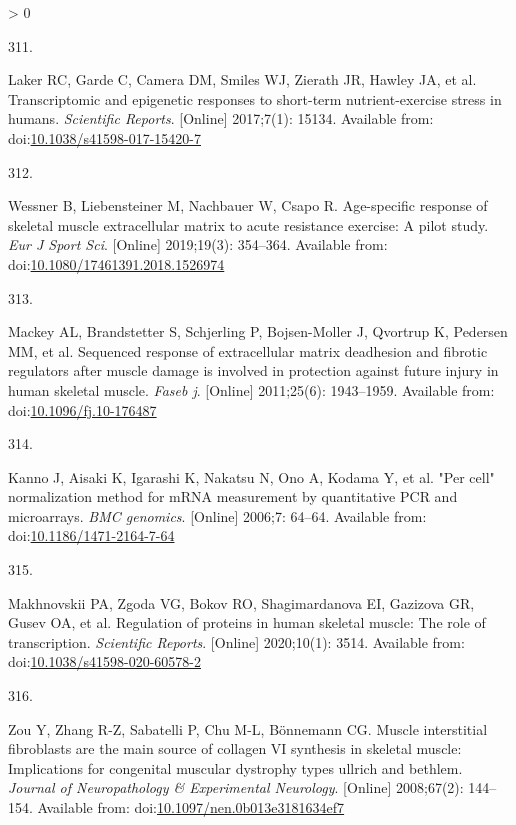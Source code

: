 \documentclass[twoside,10pt]{gihclass} %
\newlength{\cslhangindent}
\newlength{\csllabelwidth}
\newenvironment{CSLReferences}[3] %
 {%
  \setlength{\parindent}{0pt}
  \ifodd #1 \everypar{\setlength{\hangindent}{\cslhangindent}}\ignorespaces\fi
  \ifnum #2 > 0
  \setlength{\parskip}{#2\baselineskip}
  \fi
 }%
 {}
\newcommand{\CSLLeftMargin}[1]{\parbox[t]{\maxof{\widthof{#1}}{\csllabelwidth}}{#1}}
\newcommand{\CSLRightInline}[1]{\parbox[t]{\linewidth}{#1}}
\begin{document}
\begin{CSLReferences}{0}{0}
\leavevmode\hypertarget{ref-RN2401}{}%
\CSLLeftMargin{311. }
\CSLRightInline{Laker RC, Garde C, Camera DM, Smiles WJ, Zierath JR, Hawley JA, et al. Transcriptomic and epigenetic responses to short-term nutrient-exercise stress in humans. \emph{Scientific Reports}. {[}Online{]} 2017;7(1): 15134. Available from: doi:\href{https://doi.org/10.1038/s41598-017-15420-7}{10.1038/s41598-017-15420-7}}

\leavevmode\hypertarget{ref-RN2451}{}%
\CSLLeftMargin{312. }
\CSLRightInline{Wessner B, Liebensteiner M, Nachbauer W, Csapo R. Age-specific response of skeletal muscle extracellular matrix to acute resistance exercise: A pilot study. \emph{Eur J Sport Sci}. {[}Online{]} 2019;19(3): 354--364. Available from: doi:\href{https://doi.org/10.1080/17461391.2018.1526974}{10.1080/17461391.2018.1526974}}

\leavevmode\hypertarget{ref-RN2453}{}%
\CSLLeftMargin{313. }
\CSLRightInline{Mackey AL, Brandstetter S, Schjerling P, Bojsen-Moller J, Qvortrup K, Pedersen MM, et al. Sequenced response of extracellular matrix deadhesion and fibrotic regulators after muscle damage is involved in protection against future injury in human skeletal muscle. \emph{Faseb j}. {[}Online{]} 2011;25(6): 1943--1959. Available from: doi:\href{https://doi.org/10.1096/fj.10-176487}{10.1096/fj.10-176487}}

\leavevmode\hypertarget{ref-RN2182}{}%
\CSLLeftMargin{314. }
\CSLRightInline{Kanno J, Aisaki K, Igarashi K, Nakatsu N, Ono A, Kodama Y, et al. "Per cell" normalization method for mRNA measurement by quantitative PCR and microarrays. \emph{BMC genomics}. {[}Online{]} 2006;7: 64--64. Available from: doi:\href{https://doi.org/10.1186/1471-2164-7-64}{10.1186/1471-2164-7-64}}

\leavevmode\hypertarget{ref-RN2448}{}%
\CSLLeftMargin{315. }
\CSLRightInline{Makhnovskii PA, Zgoda VG, Bokov RO, Shagimardanova EI, Gazizova GR, Gusev OA, et al. Regulation of proteins in human skeletal muscle: The role of transcription. \emph{Scientific Reports}. {[}Online{]} 2020;10(1): 3514. Available from: doi:\href{https://doi.org/10.1038/s41598-020-60578-2}{10.1038/s41598-020-60578-2}}

\leavevmode\hypertarget{ref-RN2883}{}%
\CSLLeftMargin{316. }
\CSLRightInline{Zou Y, Zhang R-Z, Sabatelli P, Chu M-L, Bönnemann CG. Muscle interstitial fibroblasts are the main source of collagen VI synthesis in skeletal muscle: Implications for congenital muscular dystrophy types ullrich and bethlem. \emph{Journal of Neuropathology \& Experimental Neurology}. {[}Online{]} 2008;67(2): 144--154. Available from: doi:\href{https://doi.org/10.1097/nen.0b013e3181634ef7}{10.1097/nen.0b013e3181634ef7}}


\end{CSLReferences}
\end{document}
